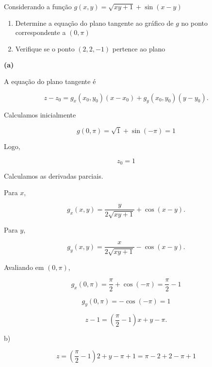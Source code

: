 \documentclass[a4paper,12pt,fleqn]{article}
\begin{document}
Considerando a função
\(
  g(x, y) = \sqrt{xy + 1} + \sin(x-y)
\)
\begin{enumerate}[label=\alph*),nosep]
  \item Determine a equação do plano tangente ao gráfico de $g$
        no ponto correspondente a \((0, \pi)\)
  \item Verifique se o ponto \((2, 2, -1)\) pertence ao plano
\end{enumerate}

\begin{answer}
  \textbf{(a)}

  A equação do plano tangente é

  \[
  z-z_0
  =
  g_x(x_0,y_0)(x-x_0)
  +
  g_y(x_0,y_0)(y-y_0).
  \]

  Calculamos inicialmente

  \[
  g(0,\pi)
  =
  \sqrt{1}+\sin(-\pi)
  =
  1
  \]

  Logo,

  \[
  z_0=1
  \]

  Calculamos as derivadas parciais.

  Para \(x\),

  \[
  g_x(x,y)
  =
  \frac{y}{2\sqrt{xy+1}}
  +
  \cos(x-y).
  \]

  Para \(y\),

  \[
  g_y(x,y)
  =
  \frac{x}{2\sqrt{xy+1}}
  -
  \cos(x-y).
  \]

  Avaliando em \((0,\pi)\),

  \[
  g_x(0,\pi)
  =
  \frac{\pi}{2}+\cos(-\pi)
  = \frac{\pi}{2} - 1
  \]

  \[
  g_y(0,\pi)
  =
  -\cos(-\pi)
  = 1
  \]

  \[
  z-1
  =
  \left(\frac{\pi}{2} - 1 \right)x
  + y - \pi.
  \]

  b)

  \[
    z
    =
    \left(\frac{\pi}{2} - 1 \right)2
    + y - \pi + 1
    = \pi -2 +2 -\pi + 1
    \]


\end{answer}

\end{document}
